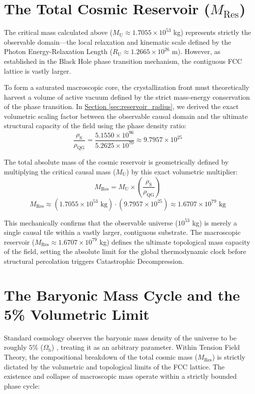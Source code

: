 \section{The Total Cosmic Reservoir ($M_{\mathrm{Res}}$)}
\label{sec:reservoir_mass}

The critical mass calculated above ($M_{\mathrm{U}} \approx 1.7055 \times 10^{53}$ kg) represents strictly the observable domain---the local relaxation and kinematic scale defined by the Photon Energy-Relaxation Length ($R_{\mathrm{U}} \approx 1.2665 \times 10^{26}$ m). However, as established in the Black Hole phase transition mechanism, the contiguous FCC lattice is vastly larger.

To form a saturated macroscopic core, the crystallization front must theoretically harvest a volume of active vacuum defined by the strict mass-energy conservation of the phase transition. In \hyperref[sec:reservoir_radius]{Section \ref*{sec:reservoir_radius}}, we derived the exact volumetric scaling factor between the observable causal domain and the ultimate structural capacity of the field using the phase density ratio:
\begin{equation}
    \frac{\rho_{\mathrm{S}}}{\rho_{\mathrm{QG}}} = \frac{5.1550 \times 10^{96}}{5.2625 \times 10^{70}} \approx 9.7957 \times 10^{25}
\end{equation}

The total absolute mass of the cosmic reservoir is geometrically defined by multiplying the critical causal mass ($M_{\mathrm{U}}$) by this exact volumetric multiplier:
\begin{equation}
    M_{\mathrm{Res}} = M_{\mathrm{U}} \times \left( \frac{\rho_{\mathrm{S}}}{\rho_{\mathrm{QG}}} \right)
\end{equation}
\begin{equation}
    M_{\mathrm{Res}} \approx (1.7055 \times 10^{53} \text{ kg}) \cdot (9.7957 \times 10^{25}) \approx 1.6707 \times 10^{79} \text{ kg}
\end{equation}

This mechanically confirms that the observable universe ($10^{53}$ kg) is merely a single causal tile within a vastly larger, contiguous substrate. The macroscopic reservoir ($M_{\mathrm{Res}} \approx 1.6707 \times 10^{79}$ kg) defines the ultimate topological mass capacity of the field, setting the absolute limit for the global thermodynamic clock before structural percolation triggers Catastrophic Decompression.

\section{The Baryonic Mass Cycle and the 5\% Volumetric Limit}
\label{sec:octahedral_masslimit}
Standard cosmology observes the baryonic mass density of the universe to be roughly $5\%$ ($\Omega_{\mathrm{b}}$) \cite{Planck_2018}, treating it as an arbitrary parameter. Within Tension Field Theory, the compositional breakdown of the total cosmic mass ($M_{\mathrm{Res}}$) is strictly dictated by the volumetric and topological limits of the FCC lattice. The existence and collapse of macroscopic mass operate within a strictly bounded phase cycle:

